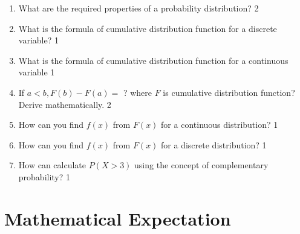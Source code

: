 \documentclass[a4paper,oneside, margin=1.4in]{book}
\begin{document}
\begin{enumerate}
\item What are the required properties of a probability distribution? \hfill 2

\item What is the formula of cumulative distribution function for a discrete variable? \hfill 1

\item What is the formula of cumulative distribution function for a continuous variable \hfill 1

\item If $a<b, F(b) - F(a) =$ ? where $F$ is cumulative distribution function? Derive mathematically. \hfill 2

\item How can you find $f(x)$ from $F(x)$ for a continuous distribution? \hfill 1

\item How can you find $f(x)$ from $F(x)$ for a discrete distribution? \hfill 1

  \item How can calculate $P(X>3)$ using the concept of complementary probability?  \hfill 1




  \end{enumerate}

\chapter{Mathematical Expectation} 
\end{document}
